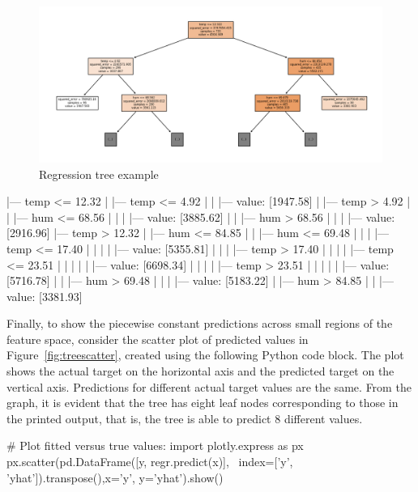\begin{figure}
\centering

\includegraphics[width=.8\textwidth]{reg_tree.png}
\caption{Regression tree example}
\label{fig:regtree}
\end{figure}

\begin{samepage}
\begin{textcode}
|--- temp <= 12.32
|   |--- temp <= 4.92
|   |   |--- value: [1947.58]
|   |--- temp >  4.92
|   |   |--- hum <= 68.56
|   |   |   |--- value: [3885.62]
|   |   |--- hum >  68.56
|   |   |   |--- value: [2916.96]
|--- temp >  12.32
|   |--- hum <= 84.85
|   |   |--- hum <= 69.48
|   |   |   |--- temp <= 17.40
|   |   |   |   |--- value: [5355.81]
|   |   |   |--- temp >  17.40
|   |   |   |   |--- temp <= 23.51
|   |   |   |   |   |--- value: [6698.34]
|   |   |   |   |--- temp >  23.51
|   |   |   |   |   |--- value: [5716.78]
|   |   |--- hum >  69.48
|   |   |   |--- value: [5183.22]
|   |--- hum >  84.85
|   |   |--- value: [3381.93]
\end{textcode}
\end{samepage}

Finally, to show the piecewise constant predictions across small regions of the feature space, consider the scatter plot of predicted values in Figure~\ref{fig:treescatter}, created using the following Python code block. The plot shows the actual target on the horizontal axis and the predicted target on the vertical axis. Predictions for different actual target values are the same. From the graph, it is evident that the tree has eight leaf nodes corresponding to those in the printed output, that is, the tree is able to predict 8 different values. 

\begin{samepage}
\begin{pythoncode}
# Plot fitted versus true values:
import plotly.express as px
px.scatter(pd.DataFrame([y, regr.predict(x)], \
    index=['y', 'yhat']).transpose(),x='y', y='yhat').show()
\end{pythoncode}
\end{samepage}

